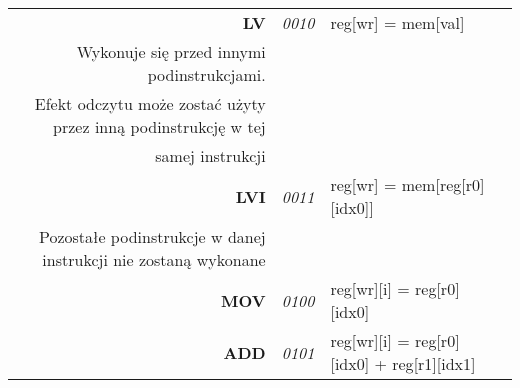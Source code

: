 \begin{landscape}
\begin{longtable}[c]{|r|l|l|l|}
\textbf{LV}                               & \textit{0010}                     & reg{[}wr{]} = mem{[}val{]}                                                                                                                  & \begin{tabular}[c]{@{}l@{}}$\mathtt{i\in\left\lbrace 2, 3 \right\rbrace }$\\ Wykonuje się przed innymi podinstrukcjami. \\ Efekt odczytu może zostać użyty przez inną podinstrukcję w tej\\ samej instrukcji\end{tabular}                                                                                                                                                      \\ \hline
\textbf{LVI}                              & \textit{0011}                     & reg{[}wr{]} = mem{[}reg{[}r0{]}{[}idx0{]}{]}                                                                                                & \begin{tabular}[c]{@{}l@{}}$\mathtt{i=3}$\\ Pozostałe podinstrukcje w danej instrukcji nie zostaną wykonane\end{tabular}                                                                                                                                                                                                                                                       \\ \hline
\textbf{MOV}                              & \textit{0100}                     & reg{[}wr{]}{[}i{]} = reg{[}r0{]}{[}idx0{]}                                                                                                  &                                                                                                                                                                                                                                                                                                                                                                                \\ \hline
\textbf{ADD}                              & \textit{0101}                     & reg{[}wr{]}{[}i{]} = reg{[}r0{]}{[}idx0{]} + reg{[}r1{]}{[}idx1{]}                                                                          &                                                                                                                                                                                                                                                                                                                                                                                \\ \hline

\end{longtable}
\end{landscape}
